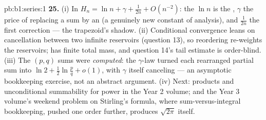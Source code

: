 \begin{solution}{pb:b1:series:1}
\textbf{25.} (i) In $H_n = \ln n + \gamma + \frac{1}{2n} +
O(n^{-2})$: the $\ln n$ is the , $\gamma$ the price of
replacing a sum by an  (a genuinely new constant of
analysis), and $\frac{1}{2n}$ the first correction --- the
trapezoid's shadow. (ii) Conditional convergence leans on
cancellation between two infinite reservoirs (question 13), so
reordering re-weights the reservoirs;  has
finite total mass, and question 14's tail estimate is
order-blind. (iii) The $(p,q)$ sums were \emph{computed}: the
$\gamma$-law turned each rearranged partial sum into $\ln 2 +
\frac12\ln\frac pq + o(1)$, with $\gamma$ itself canceling ---
an asymptotic bookkeeping exercise, not an abstract argument.
(iv) Next: products and unconditional summability for power
 in the Year 2 volume; and the Year 3 volume's weekend
problem on Stirling's formula, where sum-versus-integral
bookkeeping, pushed one order further, produces $\sqrt{2\pi}$
itself.
\end{solution}
